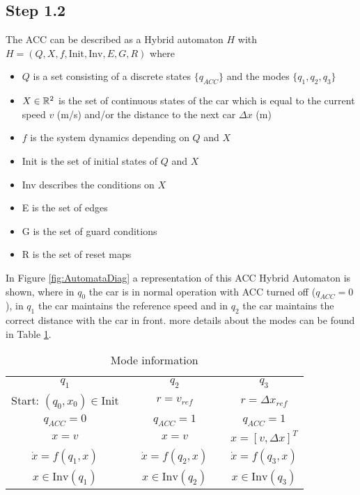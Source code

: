 \subsection*{Step 1.2}

The ACC can be described as a Hybrid automaton $H$ with $H = (Q,X,f,\text{Init},\text{Inv},E,G,R)$ where
\begin{itemize}
    \item $Q$ is a set consisting of a discrete states $\{q_{ACC}\}$ and the modes $\{q_1,q_2,q_3\}$
    \item $X \in \mathbb{R}^2$ is the set of continuous states of the car which is equal to the current speed $v$ (m/s) and/or the distance to the next car $\Delta x$ (m)
    \item $f$ is the system dynamics depending on $Q$ and $X$
    \item Init is the set of initial states of $Q$ and $X$
    \item Inv describes the conditions on $X$
    \item E is the set of edges
    \item G is the set of guard conditions
    \item R is the set of reset maps
\end{itemize}
In Figure \ref{fig:AutomataDiag} a representation of this ACC Hybrid Automaton is shown, where in $q_0$ the car is in normal operation with ACC turned off ($q_{ACC} = 0$), in $q_1$ the car maintains the reference speed and in $q_2$ the car maintains the correct distance with the car in front.  more details about the modes can be found in Table \ref{tab:modeInfo}.
\begin{table}[ht]
\centering
\caption{Mode information}

\begin{tabular}{|c|c|c|c|c|}
\cline{1-1} \cline{3-3} \cline{5-5}
$q_1$                            &  & $q_2$                   &  & $q_3$                   \\ \cline{1-1} \cline{3-3} \cline{5-5} 
Start: $(q_0,x_0)\in\text{Init}$ &  & $r = v_{ref}$           &  & $r = \Delta x_{ref}$    \\
$q_{ACC} = 0$                    &  & $q_{ACC} = 1$           &  & $q_{ACC} = 1$           \\
$x = v$                          &  & $x = v$                 &  & $x = [v, \Delta x]^T$   \\
$\dot{x}=f(q_1,x)$               &  & $\dot{x}=f(q_2,x)$      &  & $\dot{x}=f(q_3,x)$      \\
$x \in \text{Inv}(q_1)$          &  & $x \in \text{Inv}(q_2)$ &  & $x \in \text{Inv}(q_3)$ \\ \cline{1-1} \cline{3-3} \cline{5-5} 
\end{tabular}

\label{tab:modeInfo}
\end{table}

